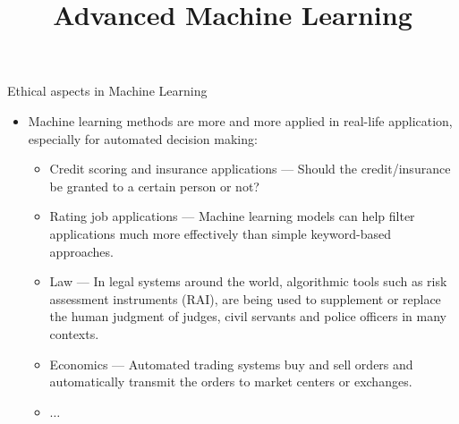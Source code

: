 



\newcommand{\sens}{\mathbf{A}} %
\newcommand{\ba}{\mathbf{a}}
\newcommand{\batilde}{\tilde{\mathbf{a}}}
\newcommand{\Px}{\mathbb{P}_{x}} %
\newcommand{\Pxj}{\mathbb{P}_{x_j}} %
\newcommand{\indep}{\perp \!\!\! \perp} %

\usepackage{multicol}

\newcommand{\titlefigure}{figure/fairness_logo.PNG}
\newcommand{\learninggoals}{
  \item Know why fairness aspects are relevant for Machine Learning
  \item Get familar with prevalent fairness criteria
  \item Know their disadvantages and their relationship
}

\title{Advanced Machine Learning}
\date{}






\sloppy

\begin{vbframe}{Ethical aspects in Machine Learning}
%
  \begin{itemize}
%  	
    \item Machine learning methods are more and more applied in real-life application, especially for automated decision making:
%
    \begin{itemize}
%    	
		\item Credit scoring and insurance applications --- Should the credit/insurance be granted to a certain person or not?
%		
		\item Rating job applications --- Machine learning models can help filter applications much more effectively than simple keyword-based approaches.
%		
		\item Law ---  In legal systems around the world, algorithmic tools such as risk assessment instruments (RAI), are being used to supplement or replace the human judgment of judges, civil servants and police officers in many contexts. 
%		
		\item Economics --- Automated trading systems buy and sell orders and automatically transmit the orders to market centers or exchanges. 
%		
		\item $\ldots$
%    	
    \end{itemize}
%
  \end{itemize}
%
\end{vbframe}

